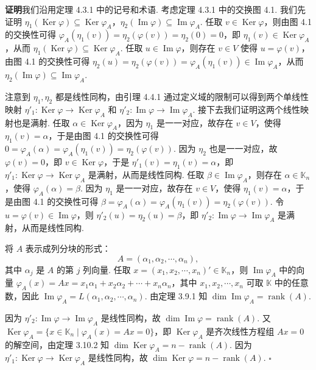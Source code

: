 \documentclass[UTF8,12pt,a4paper,fontset=fandol]{ctexart}
\begin{document}
\noindent\textbf{证明}\quad 我们沿用定理 4.3.1 中的记号和术语. 考虑定理 4.3.1 中的交换图 4.1. 我们先证明 $\eta_1(\operatorname{Ker}\varphi)\subseteq\operatorname{Ker}\varphi_A$，$\eta_2(\operatorname{Im}\varphi)\subseteq\operatorname{Im}\varphi_A$. 任取 $v\in\operatorname{Ker}\varphi$，则由图 4.1 的交换性可得 $\varphi_A(\eta_1(v))=\eta_2(\varphi(v))=\eta_2(0)=0$，即 $\eta_1(v)\in\operatorname{Ker}\varphi_A$，从而 $\eta_1(\operatorname{Ker}\varphi)\subseteq\operatorname{Ker}\varphi_A$. 任取 $u\in\operatorname{Im}\varphi$，则存在 $v\in V$ 使得 $u=\varphi(v)$，由图 4.1 的交换性可得 $\eta_2(u)=\eta_2(\varphi(v))=\varphi_A(\eta_1(v))\in\operatorname{Im}\varphi_A$，从而 $\eta_2(\operatorname{Im}\varphi)\subseteq\operatorname{Im}\varphi_A$.

注意到 $\eta_1,\eta_2$ 都是线性同构，由引理 4.4.1 通过定义域的限制可以得到两个单线性映射 $\eta'_1:\operatorname{Ker}\varphi\to\operatorname{Ker}\varphi_A$ 和 $\eta'_2:\operatorname{Im}\varphi\to\operatorname{Im}\varphi_A$. 接下去我们证明这两个线性映射也是满射. 任取 $\alpha\in\operatorname{Ker}\varphi_A$，因为 $\eta_1$ 是一一对应，故存在 $v\in V$，使得 $\eta_1(v)=\alpha$，于是由图 4.1 的交换性可得 $0=\varphi_A(\alpha)=\varphi_A(\eta_1(v))=\eta_2(\varphi(v))$. 因为 $\eta_2$ 也是一一对应，故 $\varphi(v)=0$，即 $v\in\operatorname{Ker}\varphi$，于是 $\eta'_1(v)=\eta_1(v)=\alpha$，即 $\eta'_1:\operatorname{Ker}\varphi\to\operatorname{Ker}\varphi_A$ 是满射，从而是线性同构. 任取 $\beta\in\operatorname{Im}\varphi_A$，则存在 $\alpha\in\mathbb{K}_n$，使得 $\varphi_A(\alpha)=\beta$. 因为 $\eta_1$ 是一一对应，故存在 $v\in V$，使得 $\eta_1(v)=\alpha$，于是由图 4.1 的交换性可得 $\beta=\varphi_A(\alpha)=\varphi_A(\eta_1(v))=\eta_2(\varphi(v))$. 令 $u=\varphi(v)\in\operatorname{Im}\varphi$，则 $\eta'_2(u)=\eta_2(u)=\beta$，即 $\eta'_2:\operatorname{Im}\varphi\to\operatorname{Im}\varphi_A$ 是满射，从而是线性同构.

将 $A$ 表示成列分块的形式：
\[
A=(\alpha_1,\alpha_2,\cdots,\alpha_n),
\]
其中 $\alpha_j$ 是 $A$ 的第 $j$ 列向量. 任取 $x=(x_1,x_2,\cdots,x_n)'\in\mathbb{K}_n$，则 $\operatorname{Im}\varphi_A$ 中的向量 $\varphi_A(x)=Ax=x_1\alpha_1+x_2\alpha_2+\cdots+x_n\alpha_n$，其中 $x_1,x_2,\cdots,x_n$ 可取 $\mathbb{K}$ 中的任意数，因此 $\operatorname{Im}\varphi_A=L(\alpha_1,\alpha_2,\cdots,\alpha_n)$. 由定理 3.9.1 知 $\dim\operatorname{Im}\varphi_A=\operatorname{rank}(A)$.

因为 $\eta'_2:\operatorname{Im}\varphi\to\operatorname{Im}\varphi_A$ 是线性同构，故 $\dim\operatorname{Im}\varphi=\operatorname{rank}(A)$. 又 $\operatorname{Ker}\varphi_A=\{x\in\mathbb{K}_n\mid \varphi_A(x)=Ax=0\}$，即 $\operatorname{Ker}\varphi_A$ 是齐次线性方程组 $Ax=0$ 的解空间，由定理 3.10.2 知 $\dim\operatorname{Ker}\varphi_A=n-\operatorname{rank}(A)$. 因为 $\eta'_1:\operatorname{Ker}\varphi\to\operatorname{Ker}\varphi_A$ 是线性同构，故 $\dim\operatorname{Ker}\varphi=n-\operatorname{rank}(A)$. $\square$
\end{document}

